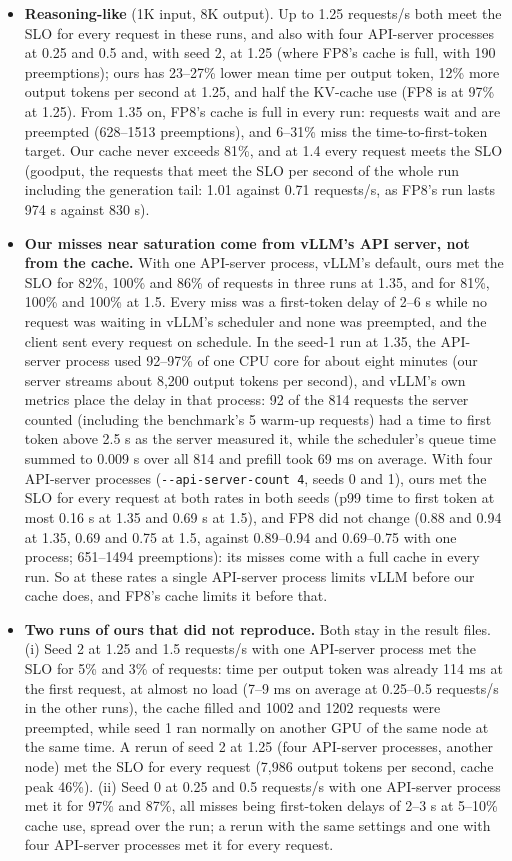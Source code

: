 \documentclass[11pt]{article}
\begin{document}
\begin{itemize}
  \item \textbf{Reasoning-like} (1K input, 8K output). Up to 1.25 requests/s both meet the SLO for every request in these runs, and also with four API-server processes at 0.25 and 0.5 and, with seed 2, at 1.25 (where FP8's cache is full, with 190 preemptions); ours has 23--27\% lower mean time per output token, 12\% more output tokens per second at 1.25, and half the KV-cache use (FP8 is at 97\% at 1.25). From 1.35 on, FP8's cache is full in every run: requests wait and are preempted (628--1513 preemptions), and 6--31\% miss the time-to-first-token target. Our cache never exceeds 81\%, and at 1.4 every request meets the SLO (goodput, the requests that meet the SLO per second of the whole run including the generation tail: 1.01 against 0.71 requests/s, as FP8's run lasts 974 s against 830 s).
  \item \textbf{Our misses near saturation come from vLLM's API server, not from the cache.} With one API-server process, vLLM's default, ours met the SLO for 82\%, 100\% and 86\% of requests in three runs at 1.35, and for 81\%, 100\% and 100\% at 1.5. Every miss was a first-token delay of 2--6 s while no request was waiting in vLLM's scheduler and none was preempted, and the client sent every request on schedule. In the seed-1 run at 1.35, the API-server process used 92--97\% of one CPU core for about eight minutes (our server streams about 8,200 output tokens per second), and vLLM's own metrics place the delay in that process: 92 of the 814 requests the server counted (including the benchmark's 5 warm-up requests) had a time to first token above 2.5 s as the server measured it, while the scheduler's queue time summed to 0.009 s over all 814 and prefill took 69 ms on average. With four API-server processes (\texttt{-{}-api-server-count 4}, seeds 0 and 1), ours met the SLO for every request at both rates in both seeds (p99 time to first token at most 0.16 s at 1.35 and 0.69 s at 1.5), and FP8 did not change (0.88 and 0.94 at 1.35, 0.69 and 0.75 at 1.5, against 0.89--0.94 and 0.69--0.75 with one process; 651--1494 preemptions): its misses come with a full cache in every run. So at these rates a single API-server process limits vLLM before our cache does, and FP8's cache limits it before that.
  \item \textbf{Two runs of ours that did not reproduce.} Both stay in the result files. (i) Seed 2 at 1.25 and 1.5 requests/s with one API-server process met the SLO for 5\% and 3\% of requests: time per output token was already 114 ms at the first request, at almost no load (7--9 ms on average at 0.25--0.5 requests/s in the other runs), the cache filled and 1002 and 1202 requests were preempted, while seed 1 ran normally on another GPU of the same node at the same time. A rerun of seed 2 at 1.25 (four API-server processes, another node) met the SLO for every request (7,986 output tokens per second, cache peak 46\%). (ii) Seed 0 at 0.25 and 0.5 requests/s with one API-server process met it for 97\% and 87\%, all misses being first-token delays of 2--3 s at 5--10\% cache use, spread over the run; a rerun with the same settings and one with four API-server processes met it for every request.

\end{itemize}
\end{document}
